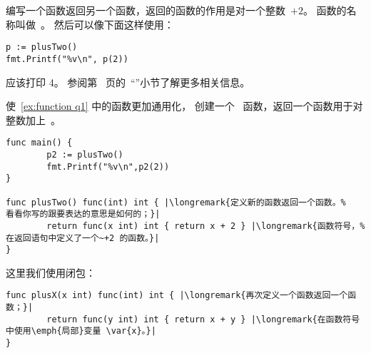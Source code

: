\begin{Exercise}[title={函数返回一个函数},difficulty=6]
\label{ex:function}
\Question\label{ex:function q1} 编写一个函数返回另一个函数，返回的函数的作用是对一个整数~$+2$。
函数的名称叫做~。
然后可以像下面这样使用：
\begin{lstlisting}
p := plusTwo()
fmt.Printf("%v\n", p(2))
\end{lstlisting}
应该打印 4。
参阅第~\pageref{sec:callbacks} 页的~``''小节了解更多相关信息。

\Question\label{ex:function q2} 使~\ref{ex:function q1} 中的函数更加通用化，
创建一个~ 函数，返回一个函数用于对整数加上~。
\end{Exercise}

\begin{Answer}
\Question
\begin{lstlisting}
func main() {
        p2 := plusTwo()
        fmt.Printf("%v\n",p2(2))
}

func plusTwo() func(int) int { |\longremark{定义新的函数返回一个函数。%
看看你写的跟要表达的意思是如何的；}|
        return func(x int) int { return x + 2 } |\longremark{函数符号，%
在返回语句中定义了一个~+2 的函数。}|
}
\end{lstlisting}
\showremarks

\Question
这里我们使用闭包：
\begin{lstlisting}
func plusX(x int) func(int) int { |\longremark{再次定义一个函数返回一个函数；}|
        return func(y int) int { return x + y } |\longremark{在函数符号中使用\emph{局部}变量 \var{x}。}|
}
\end{lstlisting}
\showremarks
\end{Answer}
